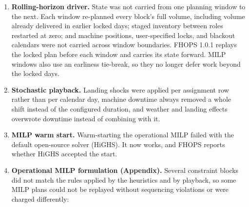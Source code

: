 \begin{enumerate}
\def\labelenumi{\arabic{enumi}.}
\tightlist
\item
  \textbf{Rolling-horizon driver.} State was not carried from one
  planning window to the next. Each window re-planned every block's full
  volume, including volume already delivered in earlier locked days;
  staged inventory between roles restarted at zero; and machine
  positions, user-specified locks, and blackout calendars were not
  carried across window boundaries. FHOPS 1.0.1 replays the locked plan
  before each window and carries its state forward. MILP windows also
  use an earliness tie-break, so they no longer defer work beyond the
  locked days.
\item
  \textbf{Stochastic playback.} Landing shocks were applied per
  assignment row rather than per calendar day, machine downtime always
  removed a whole shift instead of the configured duration, and weather
  and landing effects overwrote downtime instead of combining with it.
\item
  \textbf{MILP warm start.} Warm-starting the operational MILP failed
  with the default open-source solver (HiGHS). It now works, and FHOPS
  reports whether HiGHS accepted the start.
\item
  \textbf{Operational MILP formulation (Appendix).} Several constraint
  blocks did not match the rules applied by the heuristics and by
  playback, so some MILP plans could not be replayed without sequencing
  violations or were charged differently:


\end{enumerate}
